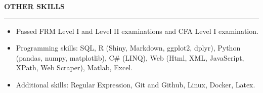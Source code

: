 \documentclass[a4paper,12pt]{report}
\begin{document}
 \par
\vspace{9pt}





\noindent 
\textbf{OTHER SKILLS} \par
\vspace{2pt}
\hrule
\vspace{6pt}
\noindent 
\begin{itemize}[noitemsep,topsep=0pt]
\item {\fontsize{12pt}{12pt}\selectfont Passed FRM Level I and Level II examinations and CFA Level I examination.} \par
\noindent 
\item {\fontsize{12pt}{12pt}\selectfont Programming skills: SQL, R (Shiny, Markdown, ggplot2, dplyr), Python (pandas, numpy, matplotlib), C\# (LINQ), Web (Html, XML, JavaScript, XPath, Web Scraper), Matlab, Excel. } \par
\noindent 
\item {\fontsize{12pt}{12pt}\selectfont Additional skills: Regular Expression, Git and Github, Linux, Docker, Latex.}\end{itemize}
 \par
\end{document}
